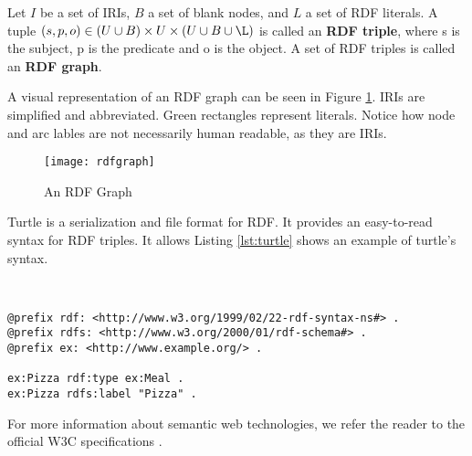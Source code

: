 \begin{definition}
    Let $I$ be a set of IRIs, $B$ a set of blank nodes, and $L$ a set of RDF literals. A tuple $\displaystyle (s,p,o) \in (U \cup B) \times U \times (U \cup B \cup \L)$ is called an \textbf{RDF triple}, where s is the subject, p is the predicate and o is the object. A set of RDF triples is called an \textbf{RDF graph}.
\end{definition}

A visual representation of an RDF graph can be seen in Figure \ref{fig:rdfgraph}. IRIs are simplified and abbreviated. Green rectangles represent literals. Notice how node and arc lables are not necessarily human readable, as they are IRIs. 

\begin{figure}[H]
    \centering
    \texttt{[image: rdfgraph]}
    \caption{An RDF Graph}
    \label{fig:rdfgraph}
\end{figure}

Turtle is a serialization and file format for RDF. It provides an easy-to-read syntax for RDF triples. It allows  Listing \ref{lst:turtle} shows an example of turtle's syntax.

\

\begin{lstlisting}[caption={Turtle example}, label=lst:turtle]
@prefix rdf: <http://www.w3.org/1999/02/22-rdf-syntax-ns#> .
@prefix rdfs: <http://www.w3.org/2000/01/rdf-schema#> .
@prefix ex: <http://www.example.org/> .

ex:Pizza rdf:type ex:Meal .
ex:Pizza rdfs:label "Pizza" .

\end{lstlisting}

For more information about semantic web technologies, we refer the reader to the official W3C specifications \cite{rdf, rdfs, owl, turtle, sparql, xsd}.